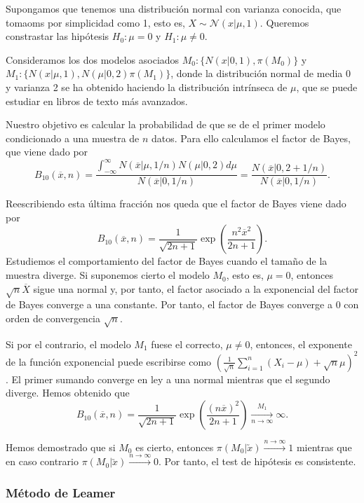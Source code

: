 \begin{ex}
	Supongamos que tenemos una distribución normal con varianza conocida, que tomaoms por simplicidad como 1, esto es, $X \sim \mathcal{N}(x | \mu,1)$. Queremos constrastar las hipótesis $H_0 : \mu = 0$ y $H_1 : \mu \ne 0$.

	Consideramos los dos modelos asociados $M_0 : \{N(x | 0,1), \pi(M_0)\}$ y $M_1 : \{N(x| \mu ,1), N(\mu |0,2)\pi(M_1)\}$, donde la distribución normal de media 0 y varianza 2 se ha obtenido haciendo la distribución intrínseca de $\mu$, que se puede estudiar en libros de texto más avanzados.

	Nuestro objetivo es calcular la probabilidad de que se de el primer modelo condicionado a una muestra de $n$ datos. Para ello calculamos el factor de Bayes, que viene dado por
    \[B_{10}(\overline{x},n) = \frac{\int_{-\infty}^\infty N(\overline{x} | \mu, 1/n) N(\mu | 0,2) d\mu}{N(\overline{x} | 0, 1/n)} = \frac{N(\overline{x} | 0, 2 + 1/n)}{N(\overline{x} | 0, 1/n)}.\]

	Reescribiendo esta última fracción nos queda que el factor de Bayes viene dado por
	\[B_{10}(\overline{x},n) = \frac{1}{\sqrt{2n+1}}  \exp\left(\frac{n^2 \overline{x}^2}{2n+1}\right).\]
	Estudiemos el comportamiento del factor de Bayes cuando el tamaño de la muestra diverge. Si suponemos cierto el modelo $M_0$, esto es, $\mu = 0$, entonces $\sqrt{n} \overline{X}$ sigue una normal y, por tanto, el factor asociado a la exponencial del factor de Bayes converge a una constante. Por tanto, el factor de Bayes converge a $0$ con orden de convergencia $\sqrt{n}$.

    Si por el contrario, el modelo $M_1$ fuese el correcto, $\mu \ne 0$, entonces, el exponente de la función exponencial puede escribirse como  $(\frac{1}{\sqrt{n}} \sum_{i=1}^{n}(X_i - \mu)  + \sqrt{n}\mu)^2$. El primer sumando converge en ley a una normal mientras que el segundo diverge. Hemos obtenido que
    \[B_{10}(\overline{x},n) = \frac{1}{\sqrt{2n+1}}  \exp\left(\frac{(n  \overline{x})^2}{2n+1}\right) \xrightarrow[n\to\infty]{M_1} \infty.\]

	Hemos demostrado que si $M_0$ es cierto, entonces $\pi(M_0 | \utilde{x}) \xrightarrow{n\to\infty} 1$ mientras que en caso contrario $\pi(M_0 | \utilde{x}) \xrightarrow{n\to\infty} 0$. Por tanto, el test de hipótesis es consistente.
\end{ex}

\subsubsection{Método de Leamer}

